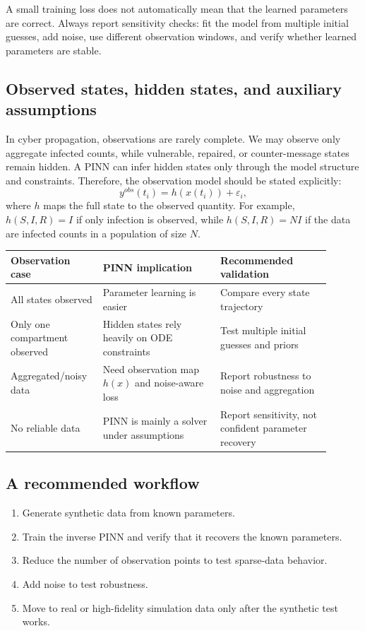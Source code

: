 \documentclass[11pt,a4paper]{article}
\begin{document}
\begin{warningbox}
A small training loss does not automatically mean that the learned parameters are correct. Always report sensitivity checks: fit the model from multiple initial guesses, add noise, use different observation windows, and verify whether learned parameters are stable.
\end{warningbox}

\subsection{Observed states, hidden states, and auxiliary assumptions}
In cyber propagation, observations are rarely complete. We may observe only aggregate infected counts, while vulnerable, repaired, or counter-message states remain hidden. A PINN can infer hidden states only through the model structure and constraints. Therefore, the observation model should be stated explicitly:
\begin{equation}
    y^{obs}(t_i)=h(x(t_i))+\varepsilon_i,
\end{equation}
where $h$ maps the full state to the observed quantity. For example, $h(S,I,R)=I$ if only infection is observed, while $h(S,I,R)=N I$ if the data are infected counts in a population of size $N$.

\begin{longtable}{p{0.24\linewidth}p{0.34\linewidth}p{0.32\linewidth}}
\toprule
Observation case & PINN implication & Recommended validation \\
\midrule
All states observed & Parameter learning is easier & Compare every state trajectory \\
Only one compartment observed & Hidden states rely heavily on ODE constraints & Test multiple initial guesses and priors \\
Aggregated/noisy data & Need observation map $h(x)$ and noise-aware loss & Report robustness to noise and aggregation \\
No reliable data & PINN is mainly a solver under assumptions & Report sensitivity, not confident parameter recovery \\
\bottomrule
\end{longtable}

\subsection{A recommended workflow}
\begin{enumerate}[leftmargin=2em]
    \item Generate synthetic data from known parameters.
    \item Train the inverse PINN and verify that it recovers the known parameters.
    \item Reduce the number of observation points to test sparse-data behavior.
    \item Add noise to test robustness.
    \item Move to real or high-fidelity simulation data only after the synthetic test works.
\end{enumerate}
\end{document}
